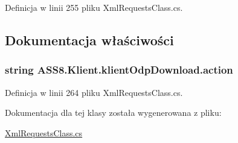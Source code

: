 Definicja w linii 255 pliku XmlRequestsClass.cs.

\subsection{Dokumentacja właściwości}
\hypertarget{a00010_f1e41ed2ca8b161225883d79faa35121}{
\subsubsection[{action}]{\setlength{\rightskip}{0pt plus 5cm}string ASS8.Klient.klientOdpDownload.action}}
\label{d7/dec/a00010_f1e41ed2ca8b161225883d79faa35121}




Definicja w linii 264 pliku XmlRequestsClass.cs.

Dokumentacja dla tej klasy została wygenerowana z pliku:\begin{CompactItemize}
\item 
\hyperlink{a00055}{XmlRequestsClass.cs}\end{CompactItemize}
